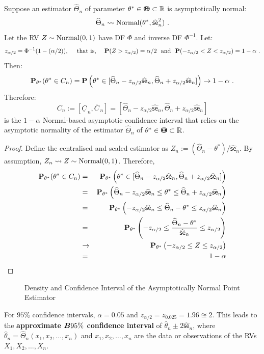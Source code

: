 \begin{prop}\label{P:NormalBasedAsympCI}
Suppose an estimator $\widehat{\Theta}_n$ of  parameter $\theta^* \in {\Theta}\mspace{-11 mu}{\Theta} \subset \mathbb{R}$ is asymptotically normal:
\[
\widehat{\Theta}_n \rightsquigarrow \mbox{{\rm Normal}}(\theta^*,\widehat{\mathsf{se}}_n^2) \ .
\]
Let the RV $Z \sim \mbox{{\rm Normal}}(0,1)$ have DF $\Phi$ and inverse DF $\Phi^{-1}$.  Let:
\[
z_{\alpha/2}=\Phi^{-1}(1-(\alpha/2)), \quad \text{ that is, } \quad \mathbf{P}(Z>z_{\alpha/2})=\alpha/2 \ \text{ and } \ \mathbf{P}(-z_{\alpha/2} < Z < z_{\alpha/2}) = 1-\alpha \ .
\]
Then:
\[
\mathbf{P}_{\theta^*}(\theta^* \in C_n)  = \mathbf{P} \left( \theta^* \in [\widehat{\Theta}_n - z_{\alpha/2} \widehat{\mathsf{se}}_n, \widehat{\Theta}_n + z_{\alpha/2} \widehat{\mathsf{se}}_n] \right) \to 1-\alpha \ .
\]
Therefore:
\[
C_n := [\underline{C}_{\, n}, \overline{C}_{\, n}]
= [\widehat{\Theta}_n - z_{\alpha/2} \widehat{\mathsf{se}}_n, \widehat{\Theta}_n + z_{\alpha/2} \widehat{\mathsf{se}}_n]
\] 
is the $1-\alpha$ Normal-based asymptotic confidence interval that relies on the asymptotic normality of the estimator $\widehat{\Theta}_n$ of $\theta^* \in {\Theta}\mspace{-11 mu}{\Theta} \subset \mathbb{R}$.
{\scriptsize
\begin{proof}
Define the centralised and scaled estimator as $Z_n := (\widehat{\Theta}_n-\theta^*)/\widehat{\mathsf{se}}_n$.  By assumption, $Z_n \rightsquigarrow Z \sim \mbox{{\rm Normal}}(0,1)$.  Therefore,
\begin{eqnarray}
\mathbf{P}_{\theta^*}(\theta^* \in C_n) 
&=& \mathbf{P}_{\theta^*} \left( \theta^* \in [\widehat{\Theta}_n - z_{\alpha/2} \widehat{\mathsf{se}}_n, \widehat{\Theta}_n + z_{\alpha/2} \widehat{\mathsf{se}}_n] \right) \notag \\
&=& \mathbf{P}_{\theta^*} \left( \widehat{\Theta}_n - z_{\alpha/2} \widehat{\mathsf{se}}_n \leq \theta^* \leq  \widehat{\Theta}_n + z_{\alpha/2} \widehat{\mathsf{se}}_n \right) \notag \\
&=& \mathbf{P}_{\theta^*} \left(  - z_{\alpha/2} \widehat{\mathsf{se}}_n \leq \widehat{\Theta}_n - \theta^* \leq   z_{\alpha/2} \widehat{\mathsf{se}}_n \right) \notag \\
&=& \mathbf{P}_{\theta^*} \left(  - z_{\alpha/2}  \leq \frac{\widehat{\Theta}_n - \theta^*}{\widehat{\mathsf{se}}_n} \leq   z_{\alpha/2} \right) \notag \\
&\to& \mathbf{P}_{\theta^*} \left(  - z_{\alpha/2}  \leq Z \leq   z_{\alpha/2} \right) \notag \\
&=& 1-\alpha \notag
\end{eqnarray}
\end{proof}
}
\begin{figure}[htb]
\caption{Density and Confidence Interval of the Asymptotically Normal Point Estimator}
\vspace{4cm}
\end{figure}
For $95\%$ confidence intervals, $\alpha=0.05$ and $z_{\alpha/2}=z_{0.025}=1.96\approxeq 2$.  This leads to the {\bf approximate $\B{95\%}$ confidence interval} of $\widehat{\theta}_n \pm 2 \widehat{\mathsf{se}}_n$, where $\widehat{\theta}_n=\widehat{\Theta}_n(x_1,x_2,\ldots,x_n)$ and $x_1,x_2,\ldots,x_n$ are the data or observations of the RVs $X_1,X_2,\ldots,X_n$.
\end{prop}

